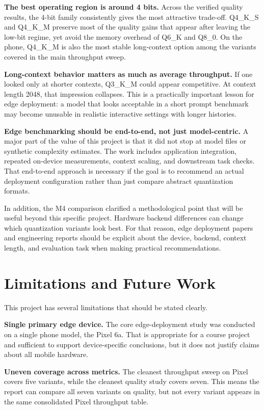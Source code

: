 \documentclass{article}
\begin{document}
\textbf{The best operating region is around 4 bits.} Across the verified quality results, the 4-bit family consistently gives the most attractive trade-off. Q4\_K\_S and Q4\_K\_M preserve most of the quality gains that appear after leaving the low-bit regime, yet avoid the memory overhead of Q6\_K and Q8\_0. On the phone, Q4\_K\_M is also the most stable long-context option among the variants covered in the main throughput sweep.

\textbf{Long-context behavior matters as much as average throughput.} If one looked only at shorter contexts, Q3\_K\_M could appear competitive. At context length 2048, that impression collapses. This is a practically important lesson for edge deployment: a model that looks acceptable in a short prompt benchmark may become unusable in realistic interactive settings with longer histories.

\textbf{Edge benchmarking should be end-to-end, not just model-centric.} A major part of the value of this project is that it did not stop at model files or synthetic complexity estimates. The work includes application integration, repeated on-device measurements, context scaling, and downstream task checks. That end-to-end approach is necessary if the goal is to recommend an actual deployment configuration rather than just compare abstract quantization formats.

In addition, the M4 comparison clarified a methodological point that will be useful beyond this specific project. Hardware backend differences can change which quantization variants look best. For that reason, edge deployment papers and engineering reports should be explicit about the device, backend, context length, and evaluation task when making practical recommendations.

\section{Limitations and Future Work}
\label{sec:limitations}

This project has several limitations that should be stated clearly.

\textbf{Single primary edge device.} The core edge-deployment study was conducted on a single phone model, the Pixel 6a. That is appropriate for a course project and sufficient to support device-specific conclusions, but it does not justify claims about all mobile hardware.

\textbf{Uneven coverage across metrics.} The cleanest throughput sweep on Pixel covers five variants, while the cleanest quality study covers seven. This means the report can compare all seven variants on quality, but not every variant appears in the same consolidated Pixel throughput table.
\end{document}

